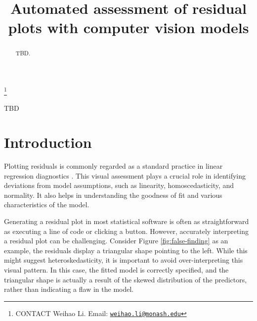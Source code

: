 \documentclass[]{interact}
\theoremstyle{plain}%
\theoremstyle{definition}
\theoremstyle{remark}
\begin{document}

\title{Automated assessment of residual plots with computer vision
models}


\author{
}

\thanks{CONTACT Weihao
Li. Email: \href{mailto:weihao.li@monash.edu}{\nolinkurl{weihao.li@monash.edu}}}

\maketitle

\begin{abstract}
TBD.
\end{abstract}

\begin{keywords}
TBD
\end{keywords}

\newpage
\tableofcontents
\newpage

\hypertarget{introduction}{%
\section{Introduction}\label{introduction}}

Plotting residuals is commonly regarded as a standard practice in linear
regression diagnostics
\citep[see][]{cook1982residuals, belsley1980regression}. This visual
assessment plays a crucial role in identifying deviations from model
assumptions, such as linearity, homoscedasticity, and normality. It also
helps in understanding the goodness of fit and various characteristics
of the model.

Generating a residual plot in most statistical software is often as
straightforward as executing a line of code or clicking a button.
However, accurately interpreting a residual plot can be challenging.
Consider Figure \ref{fig:false-finding} as an example, the residuals
display a triangular shape pointing to the left. While this might
suggest heteroskedasticity, it is important to avoid over-interpreting
this visual pattern. In this case, the fitted model is correctly
specified, and the triangular shape is actually a result of the skewed
distribution of the predictors, rather than indicating a flaw in the
model.
\end{document}
